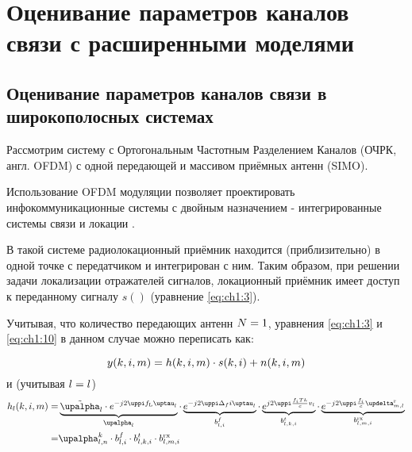 \chapter{Оценивание параметров каналов связи с расширенными моделями}\label{ch:ch2}

\section{Оценивание параметров каналов связи в широкополосных системах}\label{ch:ch2/sec1}


Рассмотрим систему с Ортогональным Частотным Разделением Каналов (ОЧРК, англ. OFDM) с одной передающей и массивом приёмных антенн (SIMO).

Использование OFDM модуляции позволяет проектировать инфокоммуникационные системы с двойным назначением - интегрированные системы связи и локации \cite{Sturm09, Sturm10, Sturm11, Braun14}.

В такой системе радиолокационный приёмник находится (приблизительно) в одной точке с передатчиком и интегрирован с ним. Таким образом, при решении задачи локализации отражателей сигналов, локационный приёмник имеет доступ к переданному сигналу $s()$ (уравнение \eqref{eq:ch1:3}).

Учитывая, что количество передающих антенн ${N}=1$, уравнения \eqref{eq:ch1:3} и \eqref{eq:ch1:10} в данном случае можно переписать как:

\let\gpai\pai
\let\ggaini\gaini
\let\gdelay\delay
\renewcommand{\pai}{{l}}
\renewcommand{\gaini}{\gain_\pai}
\renewcommand{\delay}{\tau_\pai}
\renewcommand{\vrel}{v_\pai}
\newcommand{\sx}{\Delta_x}
\newcommand{\sy}{\Delta_y}
\newcommand{\rxxi}{\rxi_x}
\newcommand{\rxyi}{\rxi_y}
\newcommand{\dcx}{\nu_\pai^x}
\newcommand{\dcy}{\nu_\pai^y}

\begin{equation}
\label{eq:ch2/sec1:3}
y(k,i,{m}) = h(k,i,{m}) \cdot s(k,i) + n(k,i,{m})
\end{equation}
и (учитывая $\gpai=\pai$)
\begin{equation}
\begin{aligned}
\label{eq:ch1/sec1:10}
\hpa(\ti,\fri,\rxi) =&\underbrace{\tgaini \cdot e^{-j2\pi \lfr \delay}}_{\gaini} \cdot 
\underbrace{e^{-j2\pi \scs \fri \delay}}_{b_{\pai,\fri}^f} \cdot
\underbrace{e^{j2\pi \frac{\sfr \ts\ti}{c} \vrel}}_{b_{\pai,\ti,\fri}^t} \cdot
\underbrace{e^{-j2\pi \frac{\sfr}{c} \delrx}}_{b_{\pai,\rxi,\fri}^\te{rx}} \\
=&\gain_{\pai,\txi}^\ti \cdot b_{\pai,\fri}^f \cdot b_{\pai,\ti,\fri}^t  \cdot b_{\pai,\rxi,\fri}^\te{rx}
\end{aligned}
\end{equation}

